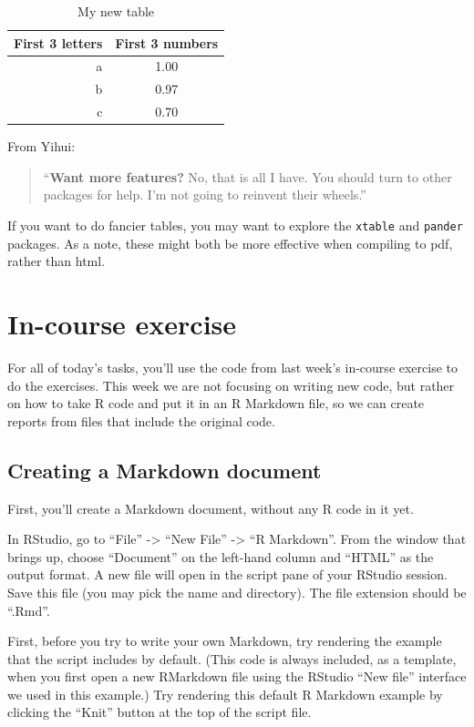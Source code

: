 \documentclass[]{book}
\theoremstyle{definition}
\theoremstyle{definition}
\theoremstyle{definition}
\theoremstyle{remark}
\begin{document}
\begin{table}

\caption{\label{tab:unnamed-chunk-320}My new table}
\centering
\begin{tabular}[t]{r|c}
\hline
First 3 letters & First 3 numbers\\
\hline
a & 1.00\\
\hline
b & 0.97\\
\hline
c & 0.70\\
\hline
\end{tabular}
\end{table}

From Yihui:

\begin{quote}
``\textbf{Want more features?} No, that is all I have. You should turn
to other packages for help. I'm not going to reinvent their wheels.''
\end{quote}

If you want to do fancier tables, you may want to explore the
\texttt{xtable} and \texttt{pander} packages. As a note, these might
both be more effective when compiling to pdf, rather than html.

\section{In-course exercise}\label{in-course-exercise-4}

For all of today's tasks, you'll use the code from last week's in-course
exercise to do the exercises. This week we are not focusing on writing
new code, but rather on how to take R code and put it in an R Markdown
file, so we can create reports from files that include the original
code.

\subsection{Creating a Markdown
document}\label{creating-a-markdown-document}

First, you'll create a Markdown document, without any R code in it yet.

In RStudio, go to ``File'' -\textgreater{} ``New File'' -\textgreater{}
``R Markdown''. From the window that brings up, choose ``Document'' on
the left-hand column and ``HTML'' as the output format. A new file will
open in the script pane of your RStudio session. Save this file (you may
pick the name and directory). The file extension should be ``.Rmd''.

First, before you try to write your own Markdown, try rendering the
example that the script includes by default. (This code is always
included, as a template, when you first open a new RMarkdown file using
the RStudio ``New file'' interface we used in this example.) Try
rendering this default R Markdown example by clicking the ``Knit''
button at the top of the script file.
\end{document}
